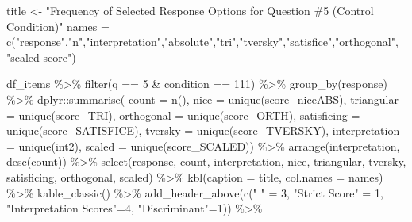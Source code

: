 \documentclass[
  letterpaper,
  DIV=11,
  numbers=noendperiod]{scrreprt}
\newenvironment{Shaded}{\begin{snugshade}}{\end{snugshade}}
\newcommand{\AttributeTok}[1]{\textcolor[rgb]{0.40,0.45,0.13}{#1}}
\newcommand{\DecValTok}[1]{\textcolor[rgb]{0.68,0.00,0.00}{#1}}
\newcommand{\FunctionTok}[1]{\textcolor[rgb]{0.28,0.35,0.67}{#1}}
\newcommand{\NormalTok}[1]{\textcolor[rgb]{0.00,0.23,0.31}{#1}}
\newcommand{\OtherTok}[1]{\textcolor[rgb]{0.00,0.23,0.31}{#1}}
\newcommand{\SpecialCharTok}[1]{\textcolor[rgb]{0.37,0.37,0.37}{#1}}
\newcommand{\StringTok}[1]{\textcolor[rgb]{0.13,0.47,0.30}{#1}}
\begin{document}
\begin{Shaded}
\begin{Highlighting}[]
\NormalTok{title }\OtherTok{\textless{}{-}} \StringTok{"Frequency of Selected Response Options for Question \#5 (Control Condition)"}
\NormalTok{names }\OtherTok{=} \FunctionTok{c}\NormalTok{(}\StringTok{"response"}\NormalTok{,}\StringTok{"n"}\NormalTok{,}\StringTok{"interpretation"}\NormalTok{,}\StringTok{"absolute"}\NormalTok{,}\StringTok{"tri"}\NormalTok{,}\StringTok{"tversky"}\NormalTok{,}\StringTok{"satisfice"}\NormalTok{,}\StringTok{"orthogonal"}\NormalTok{, }\StringTok{"scaled score"}\NormalTok{)}

\NormalTok{df\_items }\SpecialCharTok{\%\textgreater{}\%} \FunctionTok{filter}\NormalTok{(q }\SpecialCharTok{==} \DecValTok{5} \SpecialCharTok{\&}\NormalTok{ condition }\SpecialCharTok{==} \DecValTok{111}\NormalTok{) }\SpecialCharTok{\%\textgreater{}\%} \FunctionTok{group\_by}\NormalTok{(response) }\SpecialCharTok{\%\textgreater{}\%} 
\NormalTok{  dplyr}\SpecialCharTok{::}\FunctionTok{summarise}\NormalTok{( }\AttributeTok{count =} \FunctionTok{n}\NormalTok{(), }
                    \AttributeTok{nice =} \FunctionTok{unique}\NormalTok{(score\_niceABS),}
                    \AttributeTok{triangular =} \FunctionTok{unique}\NormalTok{(score\_TRI), }
                    \AttributeTok{orthogonal =}  \FunctionTok{unique}\NormalTok{(score\_ORTH),}
                    \AttributeTok{satisficing =}  \FunctionTok{unique}\NormalTok{(score\_SATISFICE),}
                    \AttributeTok{tversky =} \FunctionTok{unique}\NormalTok{(score\_TVERSKY),}
                    \AttributeTok{interpretation =} \FunctionTok{unique}\NormalTok{(int2),}
                    \AttributeTok{scaled =} \FunctionTok{unique}\NormalTok{(score\_SCALED)) }\SpecialCharTok{\%\textgreater{}\%} 
  \FunctionTok{arrange}\NormalTok{(interpretation, }\FunctionTok{desc}\NormalTok{(count)) }\SpecialCharTok{\%\textgreater{}\%} 
  \FunctionTok{select}\NormalTok{(response, count, interpretation, nice, }
\NormalTok{         triangular, tversky, satisficing, orthogonal, scaled) }\SpecialCharTok{\%\textgreater{}\%} 
  \FunctionTok{kbl}\NormalTok{(}\AttributeTok{caption =}\NormalTok{ title, }\AttributeTok{col.names =}\NormalTok{ names) }\SpecialCharTok{\%\textgreater{}\%}  \FunctionTok{kable\_classic}\NormalTok{() }\SpecialCharTok{\%\textgreater{}\%} 
  \FunctionTok{add\_header\_above}\NormalTok{(}\FunctionTok{c}\NormalTok{(}\StringTok{" "} \OtherTok{=} \DecValTok{3}\NormalTok{, }\StringTok{"Strict Score"} \OtherTok{=} \DecValTok{1}\NormalTok{, }\StringTok{"Interpretation Scores"}\OtherTok{=}\DecValTok{4}\NormalTok{, }\StringTok{"Discriminant"}\OtherTok{=}\DecValTok{1}\NormalTok{)) }\SpecialCharTok{\%\textgreater{}\%}

\end{Highlighting}
\end{Shaded}
\end{document}
